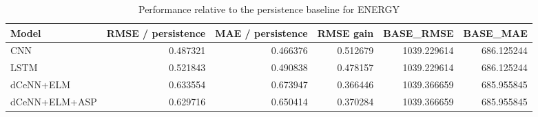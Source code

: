 \begin{table}
\caption{Performance relative to the persistence baseline for ENERGY}
\begin{tabular}{lrrrrr}
\toprule
Model & RMSE / persistence & MAE / persistence & RMSE gain & BASE\_RMSE & BASE\_MAE \\
\midrule
CNN & 0.487321 & 0.466376 & 0.512679 & 1039.229614 & 686.125244 \\
LSTM & 0.521843 & 0.490838 & 0.478157 & 1039.229614 & 686.125244 \\
dCeNN+ELM & 0.633554 & 0.673947 & 0.366446 & 1039.366659 & 685.955845 \\
dCeNN+ELM+ASP & 0.629716 & 0.650414 & 0.370284 & 1039.366659 & 685.955845 \\
\bottomrule
\end{tabular}
\end{table}

